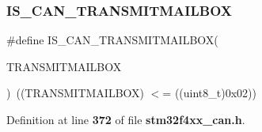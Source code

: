 \subsubsection{I\+S\+\_\+\+C\+A\+N\+\_\+\+T\+R\+A\+N\+S\+M\+I\+T\+M\+A\+I\+L\+B\+OX}
{\footnotesize\ttfamily \#define I\+S\+\_\+\+C\+A\+N\+\_\+\+T\+R\+A\+N\+S\+M\+I\+T\+M\+A\+I\+L\+B\+OX(\begin{DoxyParamCaption}\item[{}]{T\+R\+A\+N\+S\+M\+I\+T\+M\+A\+I\+L\+B\+OX }\end{DoxyParamCaption})~((T\+R\+A\+N\+S\+M\+I\+T\+M\+A\+I\+L\+B\+OX) $<$= ((uint8\+\_\+t)0x02))}



Definition at line \textbf{ 372} of file \textbf{ stm32f4xx\+\_\+can.\+h}.


